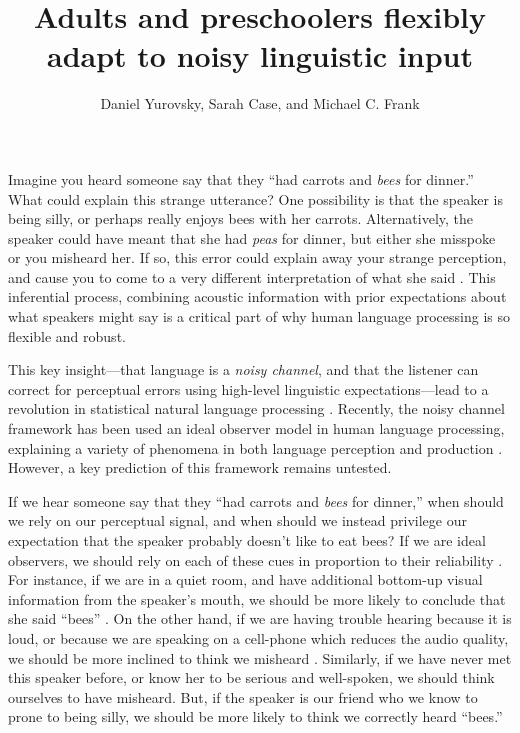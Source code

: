 \documentclass[man,floatsintext]{apa6}
\title{Adults and preschoolers flexibly adapt to noisy linguistic input}
\author{Daniel Yurovsky, Sarah Case, and Michael C. Frank}
\affiliation{Stanford University}
\begin{document}
\maketitle

Imagine you heard someone say that they ``had carrots and \emph{bees} for dinner.'' What could explain this strange utterance? One possibility is that the speaker is being silly, or perhaps really enjoys bees with her carrots. Alternatively, the speaker could have meant that she had \emph{peas} for dinner, but either she misspoke or you misheard her. If so, this error could explain away your strange perception, and cause you to come to a very different interpretation of what she said \cite{pearl1988}. This inferential process, combining acoustic information with prior expectations about what speakers might say is a critical part of why human language processing is so flexible and robust.

This key insight---that language is a \emph{noisy channel}, and that the listener can correct for perceptual errors using high-level linguistic expectations---lead to a revolution in statistical natural language processing \cite{jelinek1976, shannon1948}. Recently, the noisy channel framework has been used an ideal observer model in human language processing, explaining a variety of phenomena in both language perception and production \cite{cayards2008, levy2008, jaeger2010, kleinschmidt2015}. However, a key prediction of this framework remains untested.

If we hear someone say that they ``had carrots and \emph{bees} for dinner,'' when should we rely on our perceptual signal, and when should we instead privilege our expectation that the speaker probably doesn't like to eat bees? If we are ideal observers, we should rely on each of these cues in proportion to their reliability \cite{ernst2002, jacobs1999}. For instance, if we are in a quiet room, and have additional bottom-up visual information from the speaker's mouth, we should be more likely to conclude that she said ``bees'' \cite{mcgurk1976}. On the other hand, if we are having trouble hearing because it is loud, or because we are speaking on a cell-phone which reduces the audio quality, we should be more inclined to think we misheard \cite{schroeder1985}. Similarly, if we have never met this speaker before, or know her to be serious and well-spoken, we should think ourselves to have misheard. But, if the speaker is our friend who we know to prone to being silly, we should be more likely to think we correctly heard ``bees.''
\end{document}
